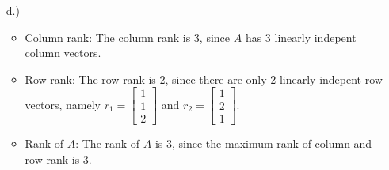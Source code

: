 \documentclass[%
   10pt,              %
   a4paper,           %
   DIV10,             %
]{scrartcl}%
\begin{document}
\begin{itemize}
	\item[d.)] \begin{itemize}
		\item Column rank: The column rank is 3, since $A$ has 3 linearly indepent column vectors.
		\item Row rank: The row rank is 2, since there are only 2 linearly indepent row vectors, namely $r_1 = \begin{bmatrix}
			1\\
			1\\
			2
		\end{bmatrix}$ and $r_2 = \begin{bmatrix}
		1\\
		2\\
		1
		\end{bmatrix}$.
		\item Rank of $A$: The rank of $A$ is 3, since the maximum rank of column and row rank is 3. 
	\end{itemize}
	
\end{itemize}
\end{document}

